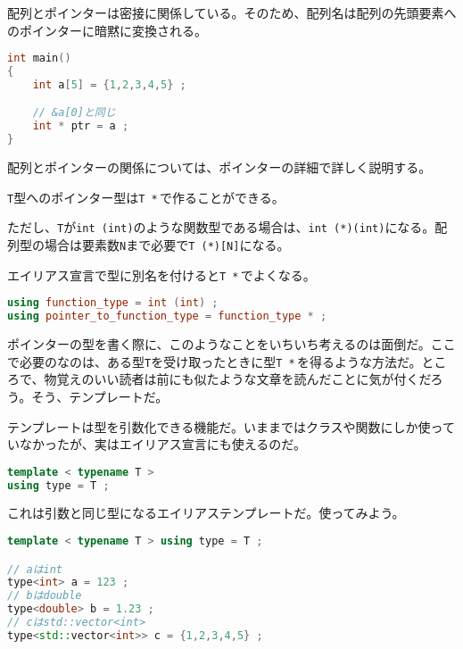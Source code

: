 配列とポインターは密接に関係している。そのため、配列名は配列の先頭要素へのポインターに暗黙に変換される。

\begin{lstlisting}[language={C++}]
int main()
{
    int a[5] = {1,2,3,4,5} ;

    // &a[0]と同じ
    int * ptr = a ;
}
\end{lstlisting}

配列とポインターの関係については、ポインターの詳細で詳しく説明する。


\texttt{T}型へのポインター型は\texttt{T *}\,で作ることができる。

ただし、\texttt{T}が\texttt{int (int)}のような関数型である場合は、\texttt{int (*)(int)}になる。配列型の場合は要素数\texttt{N}まで必要で\texttt{T (*)[N]}になる。

エイリアス宣言で型に別名を付けると\texttt{T *}\,でよくなる。

\begin{lstlisting}[language={C++}]
using function_type = int (int) ;
using pointer_to_function_type = function_type * ;
\end{lstlisting}

ポインターの型を書く際に、このようなことをいちいち考えるのは面倒だ。ここで必要のなのは、ある型\texttt{T}を受け取ったときに型\texttt{T *}\,を得るような方法だ。ところで、物覚えのいい読者は前にも似たような文章を読んだことに気が付くだろう。そう、テンプレートだ。

テンプレートは型を引数化できる機能だ。いままではクラスや関数にしか使っていなかったが、実はエイリアス宣言にも使えるのだ。

\begin{lstlisting}[language={C++}]
template < typename T >
using type = T ;
\end{lstlisting}

これは引数と同じ型になるエイリアステンプレートだ。使ってみよう。

\begin{lstlisting}[language={C++}]
template < typename T > using type = T ;

// aはint
type<int> a = 123 ;
// bはdouble
type<double> b = 1.23 ;
// cはstd::vector<int>
type<std::vector<int>> c = {1,2,3,4,5} ;
\end{lstlisting}

